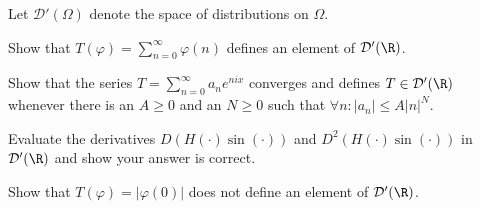 Let $\mathcal{D}'(\Omega)$ denote the space of distributions on
$\Omega$.
\begin{alist}
\item Show that $T(\varphi)=\sum_{n=0}^{\infty}\varphi(n)$  defines
an element of $\mathcal{D}'(\R)$.
\item Show that the series $T=\sum_{n=0}^{\infty}a_ne^{nix}$ converges
and defines $T\in \mathcal{D}'(\R)$ whenever there is an $A\geq 0$ and
an $N\geq 0$ such that $\forall n: |a_n|\leq A|n|^N$.
\item Evaluate the derivatives $D(H(\cdot )\sin(\cdot ))$ and 
$D^2(H(\cdot )\sin(\cdot ))$ in $\mathcal{D}'(\R)$ and show your
answer is correct.
\item Show that $T(\varphi)=|\varphi(0)|$ does not define an element
of $\mathcal{D}'(\R)$.
 \end{alist}

